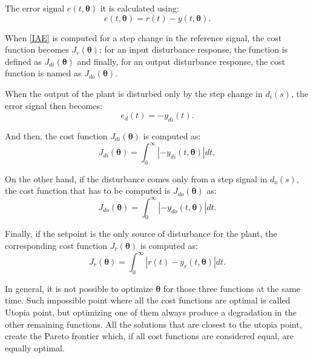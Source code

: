 The error signal $e(t, \bm{\theta})$ it is calculated using:
%
\begin{equation}  %
e(t,\bm{\theta})=r(t)-y(t,\bm{\theta}).
\label{error}
\end{equation}

When \eqref{IAE} is computed for a step change in the reference signal, the cost function becomes $J_r(\bm{\theta})$; for an input disturbance response, the function is defined as $J_{di}(\bm{\theta})$ and finally, for an output disturbance response, the cost function is named as $J_{do}(\bm{\theta})$.

When the output of the plant is disturbed only by the step change in $d_i(s)$, the error signal then becomes:
\begin{equation}  %
e_d(t)=-y_{di}(t)
\label{per}.
\end{equation}

And then, the cost function $J_{di}(\bm{\theta})$ is computed as:
\begin{equation}  %
J_{di}(\bm{\theta})= \int_0^\infty  \left |-{y_{di}(t,\bm{\theta})}\right | dt,
\label{perin}
\end{equation}

On the other hand, if the disturbance comes only from a step signal in $d_o(s)$, the cost function that has to be computed is $J_{do}(\bm{\theta})$ as:
%
\begin{equation}  %
J_{do}(\bm{\theta})= \int_0^\infty  \left |-{y_{do}(t,\bm{\theta})}\right | dt.
\label{perout}
\end{equation}	
%

Finally, if the setpoint is the only source of disturbance for the plant, the corresponding cost function $J_r(\bm{\theta})$ is computed as:
\begin{equation}  %
J_r(\bm{\theta})=\int_0^\infty \left |r(t)-y_r(t,\bm{\theta})\right | dt.
\label{eq:Jr}
\end{equation}
%

In general, it is not possible to optimize $\bm{\theta}$ for those three functions at the same time. Such impossible point where all the cost functions are optimal is called Utopia point, but optimizing one of them always produce a degradation in the other remaining functions. All the solutions that are closest to the utopia point, create the Pareto frontier which, if all cost functions are considered equal, are equally optimal. 

